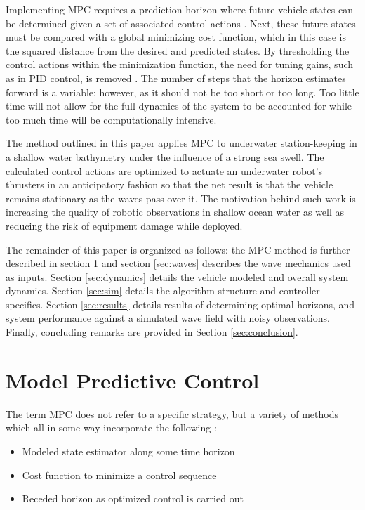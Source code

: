 \documentclass[letterpaper, 10 pt, conferences]{ieeeconf}  %
\begin{document}
Implementing MPC requires a prediction horizon where future vehicle states can be determined given a set of associated control actions \cite{camacho}. Next, these future states must be compared with a global minimizing cost function, which in this case is the squared distance from the desired and predicted states. By thresholding the control actions within the minimization function, the need for tuning gains, such as in PID control, is removed \cite{rawlings}. The number of steps that the horizon estimates forward is a variable; however, as it should not be too short or too long. Too little time will not allow for the full dynamics of the system to be accounted for while too much time will be computationally intensive.

The method outlined in this paper applies MPC to underwater station-keeping in a shallow water bathymetry under the influence of a strong sea swell. The calculated control actions are optimized to actuate an underwater robot's thrusters in an anticipatory fashion so that the net result is that the vehicle remains stationary as the waves pass over it. The motivation behind such work is increasing the quality of robotic observations in shallow ocean water as well as reducing the risk of equipment damage while deployed.

The remainder of this paper is organized as follows: the MPC method is further described in section \ref{sec:mpc} and section \ref{sec:waves} describes the wave mechanics used as inputs. Section \ref{sec:dynamics} details the vehicle modeled and overall system dynamics. Section \ref{sec:sim} details the algorithm structure and controller specifics. Section \ref{sec:results} details results of determining optimal horizons, and system performance against a simulated wave field with noisy observations. Finally, concluding remarks are provided in Section \ref{sec:conclusion}. %

\section{Model Predictive Control} 
\label{sec:mpc}

The term MPC does not refer to a specific strategy, but a variety of methods which all in some way incorporate the following \cite{camacho}:
\begin{itemize}
  \itemsep0.25em
  \item Modeled state estimator along some time horizon
  \item Cost function to minimize a control sequence 
  \item Receded horizon as optimized control is carried out 
\end{itemize}
\end{document}

